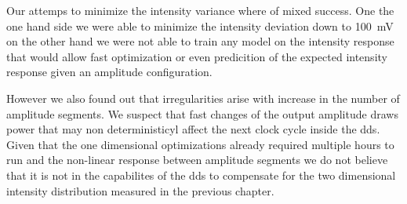 Our attemps to minimize the intensity variance where of mixed success. One
the one hand side we were able to minimize the intensity deviation down
to \SI{100}{\milli\volt} on the other hand we were not able to train any
model on the intensity response that would allow fast optimization or even
predicition of the expected intensity response given an amplitude
configuration.

However we also found out that irregularities arise with increase in the
number of amplitude segments. We suspect that fast changes of the output
amplitude draws power that may non deterministicyl affect the next clock
cycle inside the \gls{dds}. Given that the one dimensional optimizations
already required multiple hours to run and the non-linear response between
amplitude segments we do not believe that it is not in the capabilites of the
\gls{dds} to compensate for the two dimensional intensity distribution
measured in the previous chapter.
